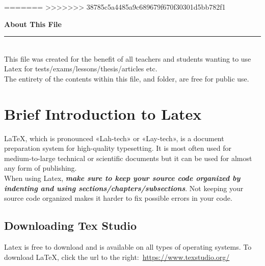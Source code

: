 \documentclass[12pt,hidelinks]{article}
\begin{document}
=======
>>>>>>> 38785c5a4485a9c689679f670f30301d5bb782f1
\tableofcontents
\vfill
\small{\noindent \textbf{About This File} \vspace{-3mm}\\
\noindent \rule{3.3cm}{0.5pt} \\
This file was created for the benefit of all teachers and students wanting to use Latex for tests/exams/lessons/thesis/articles etc.\\
The entirety of the contents within this file, and folder, are free for public use.}
\newpage
{}
\section{Brief Introduction to Latex}
\vspace{10.5cm}
	LaTeX, which is pronounced «Lah-tech» or «Lay-tech», is a document preparation system for high-quality typesetting. It is most often used for medium-to-large technical or scientific documents but it can be used for almost any form of publishing.\\
	When using Latex, \textbf{\emph{make sure to keep your source code organized by indenting and using sections/chapters/subsections}}. Not keeping your source code organized makes it harder to fix possible errors in your code.
	\subsection{Downloading Tex Studio}
			Latex is free to download and is available on all types of operating systems. To download \LaTeX, click the url to the right:\, \url{https://www.texstudio.org/}
\end{document}
